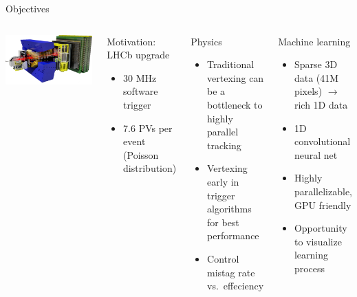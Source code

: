\begin{frame}{Objectives}

    \begin{columns}[c]
      \includegraphics[width=\textwidth, trim=0 0 0 0]{images/LHCbDet.png}
      \begin{block}{Motivation: LHCb upgrade}
        \begin{itemize}
            \item 30 MHz software trigger
            \item 7.6 PVs per event (Poisson distribution)
        \end{itemize}
      \end{block}

    \begin{block}{Physics}
    \begin{itemize}
        \item Traditional vertexing can be a bottleneck to highly parallel tracking
        \item Vertexing early in trigger algorithms for best performance
        \item Control mistag rate vs.\ effeciency
    \end{itemize}
    \end{block}

    \begin{block}{Machine learning}
    \begin{itemize}
        \item Sparse 3D data (41M pixels) $\to$ rich 1D data
        \item 1D convolutional neural net
        \item Highly parallelizable, GPU friendly
        \item Opportunity to visualize learning process
    \end{itemize}
    \end{block}

\end{columns}
\end{frame}
